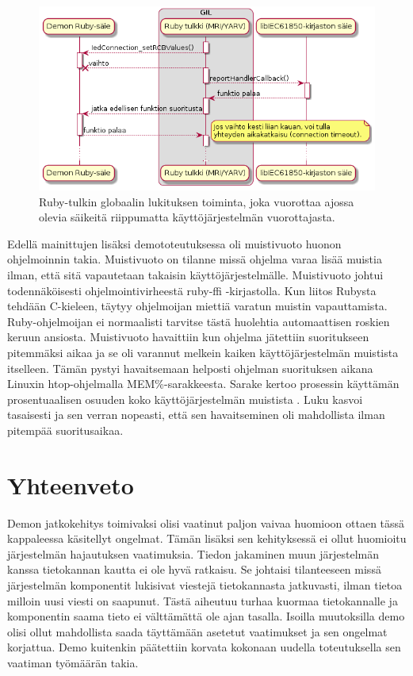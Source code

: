 \begin{figure}[ht!]
	\includegraphics[width=1\textwidth]{pictures/ruby-gil.png}
	\caption{Ruby-tulkin globaalin lukituksen toiminta, joka vuorottaa ajossa olevia säikeitä riippumatta käyttöjärjestelmän vuorottajasta.}
	\label{fig:ruby-gil}
\end{figure}

Edellä mainittujen lisäksi demototeutuksessa oli muistivuoto huonon ohjelmoinnin takia. Muistivuoto on tilanne missä ohjelma varaa lisää muistia ilman, että sitä vapautetaan takaisin käyttöjärjestelmälle. Muistivuoto johtui todennäköisesti ohjelmointivirheestä ruby-ffi -kirjastolla. Kun liitos Rubysta tehdään C-kieleen, täytyy ohjelmoijan miettiä varatun muistin vapauttamista. Ruby-ohjelmoijan ei normaalisti tarvitse tästä huolehtia automaattisen roskien keruun ansiosta. Muistivuoto havaittiin kun ohjelma jätettiin suoritukseen pitemmäksi aikaa ja se oli varannut melkein kaiken käyttöjärjestelmän muistista itselleen. Tämän pystyi havaitsemaan helposti ohjelman suorituksen aikana Linuxin htop-ohjelmalla MEM\%-sarakkeesta. Sarake kertoo prosessin käyttämän prosentuaalisen osuuden koko käyttöjärjestelmän muistista \cite{htop-user-guide}. Luku kasvoi tasaisesti ja sen verran nopeasti, että sen havaitseminen oli mahdollista ilman pitempää suoritusaikaa.


\section{Yhteenveto}
Demon jatkokehitys toimivaksi olisi vaatinut paljon vaivaa huomioon ottaen tässä kappaleessa käsitellyt ongelmat. Tämän lisäksi sen kehityksessä ei ollut huomioitu järjestelmän hajautuksen vaatimuksia. Tiedon jakaminen muun järjestelmän kanssa tietokannan kautta ei ole hyvä ratkaisu. Se johtaisi tilanteeseen missä järjestelmän komponentit lukisivat viestejä tietokannasta jatkuvasti, ilman tietoa milloin uusi viesti on saapunut. Tästä aiheutuu turhaa kuormaa tietokannalle ja komponentin saama tieto ei välttämättä ole ajan tasalla. Isoilla muutoksilla demo olisi ollut mahdollista saada täyttämään asetetut vaatimukset ja sen ongelmat korjattua. Demo kuitenkin päätettiin korvata kokonaan uudella toteutuksella sen vaatiman työmäärän takia.

